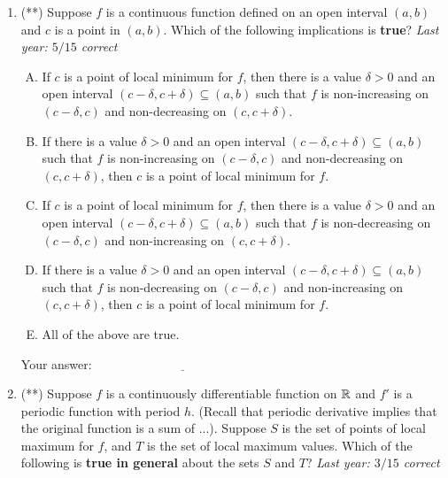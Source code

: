 \documentclass[10pt]{amsart}
\begin{document}
\begin{enumerate}
  \vspace{0.1in}
  Your answer: $\underline{\qquad\qquad\qquad\qquad\qquad\qquad\qquad}$
  \vspace{1.5in}


  {\bf PLEASE TURN OVER FOR THE THIRD AND FOURTH QUESTION.}

\newpage
\item (**) Suppose $f$ is a continuous function defined on an open interval
  $(a,b)$ and $c$ is a point in $(a,b)$. Which of the following
  implications is {\bf true}? {\em Last year: $5/15$ correct}

  \begin{enumerate}[(A)]

  \item If $c$ is a point of local minimum for $f$, then there is a
    value $\delta > 0$ and an open interval $(c - \delta, c + \delta)
    \subseteq (a,b)$ such that $f$ is non-increasing on $(c -
    \delta,c)$ and non-decreasing on $(c,c+\delta)$.
  \item If there is a value $\delta > 0$ and an open interval $(c -
    \delta, c + \delta) \subseteq (a,b)$ such that $f$ is
    non-increasing on $(c - \delta,c)$ and non-decreasing on
    $(c,c+\delta)$, then $c$ is a point of local minimum for $f$.
  \item If $c$ is a point of local minimum for $f$, then there is a
    value $\delta > 0$ and an open interval $(c - \delta, c + \delta)
    \subseteq (a,b)$ such that $f$ is non-decreasing on $(c -
    \delta,c)$ and non-increasing on $(c,c+\delta)$.
  \item If there is a value $\delta > 0$ and an open interval $(c -
    \delta, c + \delta) \subseteq (a,b)$ such that $f$ is
    non-decreasing on $(c - \delta,c)$ and non-increasing on
    $(c,c+\delta)$, then $c$ is a point of local minimum for $f$.
  \item All of the above are true.
  \end{enumerate}

  \vspace{0.1in}
  Your answer: $\underline{\qquad\qquad\qquad\qquad\qquad\qquad\qquad}$
  \vspace{1.5in}

\item (**) Suppose $f$ is a continuously differentiable function on $\mathbb{R}$
  and $f'$ is a periodic function with period $h$. (Recall that
  periodic derivative implies that the original function is a sum of
  ...). Suppose $S$ is the set of points of local maximum for $f$, and
  $T$ is the set of local maximum values. Which of the following is
  {\bf true in general} about the sets $S$ and $T$? {\em Last year:
  $3/15$ correct}


\end{enumerate}
\end{document}
